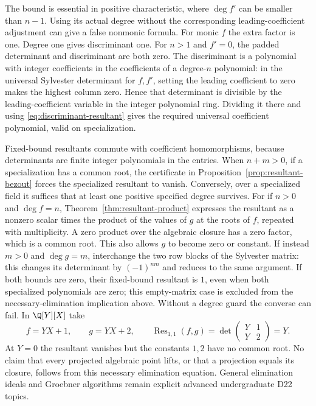 The bound is essential in positive characteristic, where
$\deg f'$ can be smaller than $n-1$. Using its actual degree
without the corresponding leading-coefficient adjustment can
give a false nonmonic formula. For monic $f$ the extra factor is
one. Degree one gives discriminant one. For $n>1$ and $f'=0$,
the padded determinant and discriminant are both zero.
The discriminant is a polynomial with integer coefficients in
the coefficients of a degree-$n$ polynomial: in the universal
Sylvester determinant for $f,f'$, setting the leading coefficient
to zero makes the highest column zero. Hence that determinant
is divisible by the leading-coefficient variable in the integer
polynomial ring. Dividing it there and using
\eqref{eq:discriminant-resultant} gives the required universal
coefficient polynomial, valid on specialization.

Fixed-bound resultants commute with coefficient homomorphisms,
because determinants are finite integer polynomials in the entries.
When $n+m>0$, if a specialization has a common root, the certificate in
Proposition~\ref{prop:resultant-bezout} forces the specialized
resultant to vanish. Conversely, over a specialized field it suffices
that at least one positive specified degree survives. For if
$n>0$ and $\deg f=n$, Theorem~\ref{thm:resultant-product} expresses the
resultant as a nonzero scalar times the product of the values of $g$
at the roots of $f$, repeated with multiplicity. A zero product over
the algebraic closure has a zero factor, which is a common root.
This also allows $g$ to become zero or constant. If instead $m>0$
and $\deg g=m$, interchange the two row blocks of the Sylvester matrix:
this changes its determinant by $(-1)^{nm}$ and reduces to the same
argument. If both bounds are zero, their fixed-bound resultant is
$1$, even when both specialized polynomials are zero; this empty-matrix
case is excluded from the necessary-elimination implication above.
Without a degree guard the converse can fail. In $\Q[Y][X]$ take
\[
 f=YX+1,\qquad g=YX+2,\qquad
 \operatorname{Res}_{1,1}(f,g)=
 \det\begin{pmatrix}Y&1\\Y&2\end{pmatrix}=Y.
\]
At $Y=0$ the resultant vanishes but the constants $1,2$ have no
common root. No claim that every projected algebraic point lifts,
or that a projection equals its closure, follows from this
necessary elimination equation. General elimination ideals and
Groebner algorithms remain explicit advanced undergraduate D22 topics.

